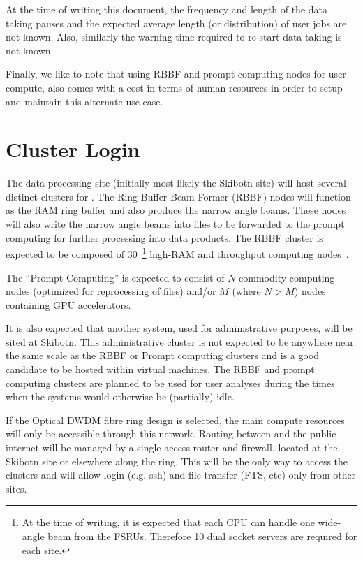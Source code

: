 \documentclass[12pt,a4paper]{article}
\begin{document}
At the time of writing this document, the frequency and length of the data taking pauses and the expected average length (or distribution) of user jobs are not known.
Also, similarly the warning time required to re-start data taking is not known.

Finally, we like to note that using RBBF and prompt computing nodes for user compute, also comes with a cost in terms of human resources in order to setup and maintain this alternate use case.  

\section{Cluster Login}
\label{sec:cluster}

The data processing site (initially most likely the Skibotn site) will host several distinct clusters for \ED.
The Ring Buffer-Beam Former (RBBF) nodes will function as the RAM ring buffer and also produce the narrow angle beams.
These nodes will also write the narrow angle beams into files to be forwarded to the prompt computing for further processing into data products.
The RBBF cluster is expected to be composed of $30$~\footnote{At the time of writing, it is expected that each CPU can handle one wide-angle beam from the FSRUs. Therefore 10 dual socket servers are required for each site.} high-RAM and throughput computing nodes~\cite{amd-epyc}.

The ``Prompt Computing'' is expected to consist of $N$ commodity computing nodes (optimized for reprocessing of files) and/or $M$ (where $N > M$) nodes containing GPU accelerators.

It is also expected that another system, used for administrative purposes, will be sited at Skibotn. This administrative cluster is not expected to be anywhere near the same scale as the RBBF or Prompt computing clusters
and is a good candidate to be hosted within virtual machines.
The RBBF and prompt computing clusters are planned to be used for \ED user analyses during the times when the systems would otherwise be (partially) idle.

If the Optical DWDM fibre ring design is selected, the main \ED compute resources will only be accessible through this network. Routing between \ED and the public internet will be managed by a single access router and firewall, located at the Skibotn site or elsewhere along the ring.
This will be the only way to access the clusters and will allow login (e.g. ssh) and file transfer (FTS, etc) only from other \EC sites. 
\end{document}
